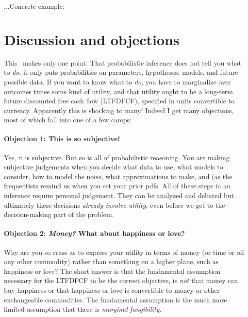 \documentclass[12pt,twoside,pdftex]{article}
\begin{document}
...Concrete example: 

\section{Discussion and objections}

This \documentname\ makes only one point: That probabilistic inference
does not tell you what to \emph{do}, it only puts probabilities on
parameters, hypotheses, models, and future possible data.  If you want
to know what to \emph{do}, you have to marginalize over outcomes times
some kind of utility, and that utility ought to be a long-term future
discounted free cash flow (LTFDFCF), specified in units convertible to
currency.  Apparently this is shocking to many!  Indeed I get many
objections, most of which fall into one of a few camps:

\paragraph{Objection 1: This is so subjective!}
Yes, it is subjective.  But so is all of probabilistic reasoning.  You
are making subjective judgements when you decide what data to use,
what models to consider, how to model the noise, what approximations
to make, and (as the frequentists remind us when you set your prior pdfs.  All of these steps in an
inference require personal judgement.  They can be analyzed and
debated but ultimately these decisions \emph{already involve utility},
even before we get to the decision-making part of the problem.

\paragraph{Objection 2: \emph{Money?} What about happiness or love?}
Why are you so crass as to express your utility in terms of money (or
time or oil any other commodity) rather than something on a higher
plane, such as happiness or love?  The short answer is that the
fundamental assumption necessary for the LTFDFCF to be the correct
objective, is \emph{not} that money can buy happiness or that
happiness or love is convertible to money or other exchangeable
commodities.  The fundamental assumption is the much more limited
assumption that there is \emph{marginal fungibility}.
\end{document}
